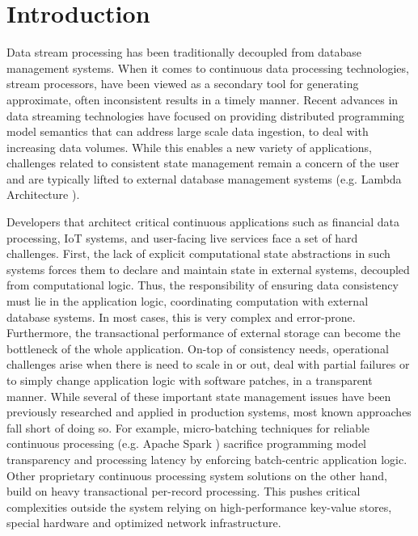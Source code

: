 
\section{Introduction}
\label{sec:intro}

Data stream processing has been traditionally decoupled from database management systems. When it comes to continuous data processing technologies, stream processors, have been viewed as a secondary tool for generating approximate, often inconsistent results in a timely manner. Recent advances in data streaming technologies have focused on providing distributed programming model semantics \cite{CUSTOM:web/Storm,CUSTOM:web/Samza} that can address large scale data ingestion, to deal with increasing data volumes. While this enables a new variety of applications, challenges related to consistent state management remain a concern of the user and are typically lifted to external database management systems (e.g. Lambda Architecture \cite{marz2015big}).

Developers that architect critical continuous applications such as financial data processing, IoT systems, and user-facing live services face a set of hard challenges. First, the lack of explicit computational state abstractions in such systems forces them to declare and maintain state in external systems, decoupled from computational logic. Thus, the responsibility of ensuring data consistency must lie in the application logic, coordinating computation with external database systems. In most cases, this is very complex and error-prone. Furthermore, the transactional performance of external storage can become the bottleneck of the whole application. On-top of consistency needs, operational challenges arise when there is need to scale in or out, deal with partial failures or to simply change application logic with software patches, in a transparent manner. While several of these important state management issues have been previously researched and applied in production systems, most known approaches fall short of doing so. For example, micro-batching techniques for reliable continuous processing (e.g. Apache Spark \cite{zaharia2012discretized,CUSTOM:web/trident}) sacrifice programming model transparency and processing latency by enforcing batch-centric application logic. Other proprietary continuous processing system solutions \cite{millwheel} on the other hand, build on heavy transactional per-record processing. This pushes critical complexities outside the system relying on high-performance key-value stores, special hardware and optimized network infrastructure. 

